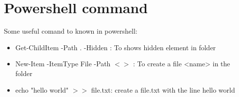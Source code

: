 \documentclass{report}
\begin{document}
\section{Powershell command} 
Some useful comand to known in powershell: 
\begin{itemize}
    \item Get-ChildItem -Path . -Hidden : To shows hidden element in folder
    \item New-Item -ItemType File -Path $<>$ : To create a file <name> in the folder
    \item echo "hello world" $>>$ file.txt: create a file.txt with the line hello world   
\end{itemize}
\end{document}
